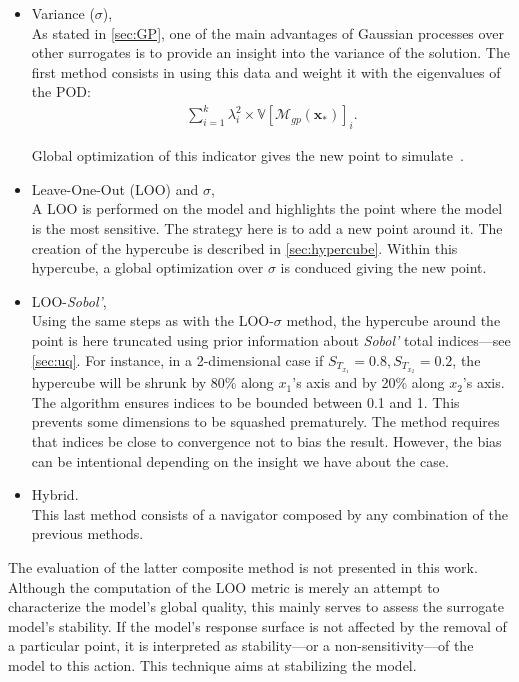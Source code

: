 \begin{itemize}
\item Variance ($\sigma$), \hfill\\
As stated in \cref{sec:GP}, one of the main advantages of Gaussian processes over other surrogates is to provide an insight into the variance of the solution. The first method consists in using this data and weight it with the eigenvalues of the POD:
\begin{align}
\sum_{i=1}^k \lambda_i^2 \times \mathbb{V}[\mathcal{M}_{gp}(\mathbf{x}_*)]_{i}.
\end{align}

Global optimization of this indicator gives the new point to simulate~\cite{wales1997}.

\item Leave-One-Out (LOO) and $\sigma$, \hfill\\
A LOO is performed on the model and highlights the point where the model is the most sensitive. The strategy here is to add a new point around it. The creation of the hypercube is described in \cref{sec:hypercube}. Within this hypercube, a global optimization over $\sigma$ is conduced giving the new point.

\item  LOO-\textit{Sobol'}, \hfill\\
Using the same steps as with the LOO-$\sigma$ method, the hypercube around the point is here truncated using prior information about \textit{Sobol'} total indices---see \cref{sec:uq}. For instance, in a 2-dimensional case if $S_{T_{x_1}} = 0.8, S_{T_{x_2}} = 0.2$, the hypercube will be shrunk by 80\% along $x_1$'s axis and by 20\% along $x_2$'s axis. The algorithm ensures indices to be bounded between 0.1 and 1. This prevents some dimensions to be squashed prematurely. The method requires that indices be close to convergence not to bias the result. However, the bias can be intentional depending on the insight we have about the case. 

\item  Hybrid.\hfill\\
This last method consists of a navigator composed by any combination of the previous methods.
\end{itemize}

The evaluation of the latter composite method is not presented in this work. Although the computation of the LOO metric is merely an attempt to characterize the model's global quality, this mainly serves to assess the surrogate model's stability. If the model's response surface is not affected by the removal of a particular point, it is interpreted as stability---or a non-sensitivity---of the model to this action. This technique aims at stabilizing the model.

